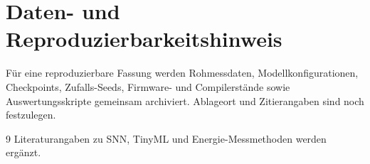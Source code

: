 \documentclass[11pt,a4paper]{article}
\begin{document}
\section*{Daten- und Reproduzierbarkeitshinweis}
Für eine reproduzierbare Fassung werden Rohmessdaten, Modellkonfigurationen, Checkpoints, Zufalls-Seeds, Firmware- und Compilerstände sowie Auswertungsskripte gemeinsam archiviert. Ablageort und Zitierangaben sind noch festzulegen.

\begin{thebibliography}{9}
 Literaturangaben zu SNN, TinyML und Energie-Messmethoden werden ergänzt.
\end{thebibliography}
\end{document}
